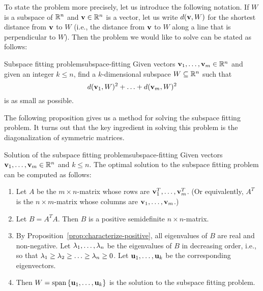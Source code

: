 To state the problem more precisely, let us introduce the following
notation. If $W$ is a subspace of $\mathbb{R}^n$ and $\vect{v}\in\R^n$ is a
vector, let us write $d(\vect{v},W)$ for the shortest distance from
$\vect{v}$ to $W$ (i.e., the distance from $\vect{v}$ to $W$ along a
line that is perpendicular to $W$). Then the problem we would like to
solve can be stated as follows:

\begin{problem}{Subspace fitting problem}{subspace-fitting}
  Given vectors $\vect{v}_1,\ldots,\vect{v}_m\in\R^n$ and given an
  integer $k\leq n$, find a $k$-dimensional subspace $W\subseteq\mathbb{R}^n$
  such that
  \begin{equation*}
    d(\vect{v}_1,W)^2 + \ldots + d(\vect{v}_m,W)^2
  \end{equation*}
  is as small as possible.
\end{problem}


The following proposition gives us a method for solving the subspace
fitting problem. It turns out that the key ingredient in solving this
problem is the diagonalization of symmetric matrices.

\begin{proposition}{Solution of the subspace fitting problem}{subspace-fitting}
  Given vectors $\vect{v}_1,\ldots,\vect{v}_m\in\R^n$ and $k\leq n$.
  The optimal solution to the subspace fitting problem can be computed
  as follows:
  \begin{enumerate}
  \item Let $A$ be the $m\times n$-matrix whose rows are
    $\vect{v}_1^T,\ldots,\vect{v}_m^T$. (Or equivalently, $A^T$ is the
    $n\times m$-matrix whose columns are
    $\vect{v}_1,\ldots,\vect{v}_m$.)
  \item Let $B=A^TA$. Then $B$ is a positive semidefinite
    $n\times n$-matrix.
  \item By Proposition~\ref{prop:characterize-positive}, all
    eigenvalues of $B$ are real and non-negative. Let
    $\lambda_1,\ldots,\lambda_n$ be the eigenvalues of $B$ in
    decreasing order, i.e., so that
    $\lambda_1\geq\lambda_2\geq\ldots\geq\lambda_n\geq 0$. Let
    $\vect{u}_1,\ldots,\vect{u}_k$ be the corresponding eigenvectors.
  \item Then $W=\sspan\set{\vect{u}_1,\ldots,\vect{u}_k}$ is the
    solution to the subspace fitting problem.
  \end{enumerate}
\end{proposition}  

